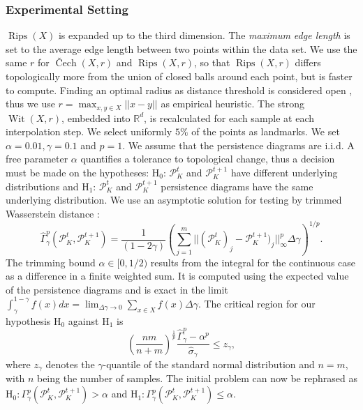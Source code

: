 \documentclass[runningheads]{llncs}
\DeclareMathOperator{\Cech}{\text{\v{C}ech}}
\DeclareMathOperator{\Rips}{\text{Rips}}
\DeclareMathOperator{\Wit}{\text{Wit}}
\begin{document}
\subsubsection{Experimental Setting} $\Rips(X)$ is expanded up to the third dimension. The \textit{maximum edge length} is set to the average edge length between two points within the data set. We use the same $r$ for $\Cech(X,r)$ and $\Rips(X,r)$, so that $\Rips(X,r)$ differs topologically more from the union of closed balls around each point, but is faster to compute. Finding an optimal radius as distance threshold is considered open \cite{ZomorodianC05}, thus we use $r = \max_{x,y \in X} ||x-y||$ as empirical heuristic. The strong $\Wit(X,r)$, embedded into $\mathbb{R}^d$, is recalculated for each sample at each interpolation step. We select uniformly $5\%$ of the points as landmarks. We set $\alpha = 0.01, \gamma = 0.1$ and $p = 1$. We assume that the persistence diagrams are i.i.d. A free parameter $\alpha$ quantifies a tolerance to topological change, thus a decision must be made on the hypotheses: $\text{H}_0$: $\mathcal{P}_K^t$ and $\mathcal{P}_K^{t+1}$ have different underlying distributions and $\text{H}_1$: $\mathcal{P}_K^t$ and $\mathcal{P}_K^{t+1}$ persistence diagrams have the same underlying distribution. We use an asymptotic solution for testing by trimmed Wasserstein distance \cite{czado1998assessing}:
\begin{equation}
\hat{\Gamma}^p_\gamma(\mathcal{P}^t_K,\mathcal{P}^{t+1}_K) = \frac{1}{(1-2\gamma)} \left( \sum_{j=1}^{m} ||(\mathcal{P}^t_K)_j-\mathcal{P}^{t+1}_K)_j||^p_\infty \Delta \gamma \right)^{1/p}.
\end{equation}
The trimming bound $\alpha \in [0, 1/2)$ results from the integral for the continuous case as a difference in a finite weighted sum. It is computed using the expected value of the persistence diagrams and is exact in the limit $\int_\gamma^{1-\gamma} f(x) dx = \lim_{\Delta\gamma \rightarrow 0} \sum_{x \in X} f(x) \Delta \gamma$. The critical region for our hypothesis $\text{H}_0$ against $\text{H}_1$ is
\begin{equation}
\left(\frac{nm}{n+m}\right)^{\frac{1}{p}} \frac{\hat{\Gamma}^p_\gamma - \alpha^p}{\hat{\sigma}_\gamma} \leq z_\gamma,
\end{equation}
where $z_\gamma$ denotes the $\gamma$-quantile of the standard normal distribution and $n=m$, with $n$ being the number of samples. The initial problem can now be rephrased as $\text{H}_0: \Gamma_\gamma^p (\mathcal{P}^t_K,\mathcal{P}^{t+1}_K) > \alpha$ and $\text{H}_1: \Gamma_\gamma^p (\mathcal{P}^t_K,\mathcal{P}^{t+1}_K) \leq \alpha$.
\end{document}
